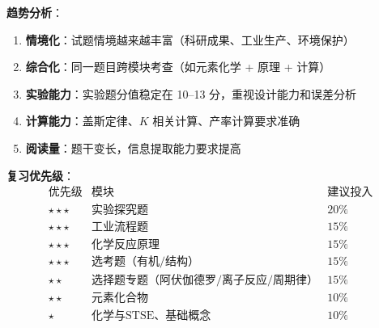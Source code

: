 \textbf{趋势分析}：
\begin{enumerate}
  \item \textbf{情境化}：试题情境越来越丰富（科研成果、工业生产、环境保护）
  \item \textbf{综合化}：同一题目跨模块考查（如元素化学 + 原理 + 计算）
  \item \textbf{实验能力}：实验题分值稳定在 10--13 分，重视设计能力和误差分析
  \item \textbf{计算能力}：盖斯定律、$K$ 相关计算、产率计算要求准确
  \item \textbf{阅读量}：题干变长，信息提取能力要求提高
\end{enumerate}

\textbf{复习优先级}：
\[
\begin{array}{c|c|c}
\text{优先级} & \text{模块} & \text{建议投入} \\ \hline
\star\star\star & \text{实验探究题} & 20\% \\
\star\star\star & \text{工业流程题} & 15\% \\
\star\star\star & \text{化学反应原理} & 15\% \\
\star\star\star & \text{选考题（有机/结构）} & 15\% \\
\star\star & \text{选择题专题（阿伏伽德罗/离子反应/周期律）} & 15\% \\
\star\star & \text{元素化合物} & 10\% \\
\star & \text{化学与STSE、基础概念} & 10\% \\
\end{array}
\]
